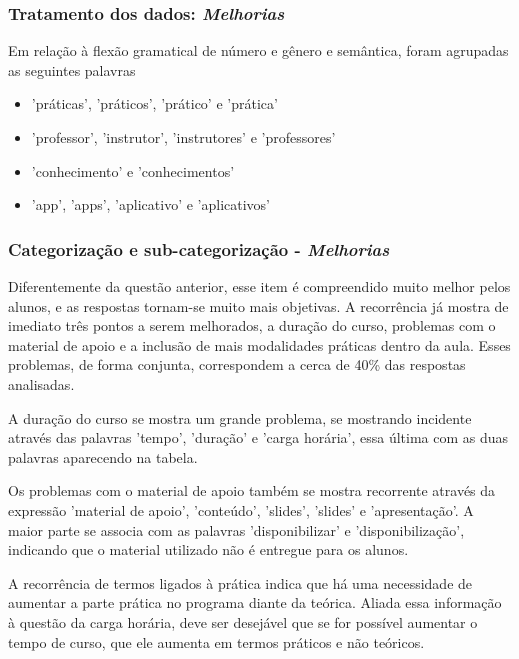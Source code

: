 \subsubsection*{Tratamento dos dados: \textit{Melhorias}}

Em relação à flexão gramatical de número e gênero e semântica, foram agrupadas as seguintes palavras

\begin{itemize}
\item 'práticas', 'práticos', 'prático' e 'prática'
\item 'professor', 'instrutor', 'instrutores' e 'professores'
\item 'conhecimento' e 'conhecimentos'
\item 'app', 'apps', 'aplicativo' e 'aplicativos'
\end{itemize}



\subsubsection*{Categorização e sub-categorização - \textit{Melhorias}}

Diferentemente da questão anterior, esse item é compreendido muito melhor pelos alunos, e as respostas tornam-se muito mais objetivas. A recorrência já mostra de imediato três pontos a serem melhorados, a duração do curso, problemas com o material de apoio e a inclusão de mais modalidades práticas dentro da aula. Esses problemas, de forma conjunta, correspondem a cerca de 40\% das respostas analisadas.

A duração do curso se mostra um grande problema, se mostrando incidente através das palavras 'tempo', 'duração' e 'carga horária', essa última com as duas palavras aparecendo na tabela.

Os problemas com o material de apoio também se mostra recorrente através da expressão 'material de apoio', 'conteúdo', 'slides', 'slides' e 'apresentação'. A maior parte se associa com as palavras 'disponibilizar' e 'disponibilização', indicando que o material utilizado não é entregue para os alunos.

A recorrência de termos ligados à prática indica que há uma necessidade de aumentar a parte prática no programa diante da teórica. Aliada essa informação à questão da carga horária, deve ser desejável que se for possível aumentar o tempo de curso, que ele aumenta em termos práticos e não teóricos.

